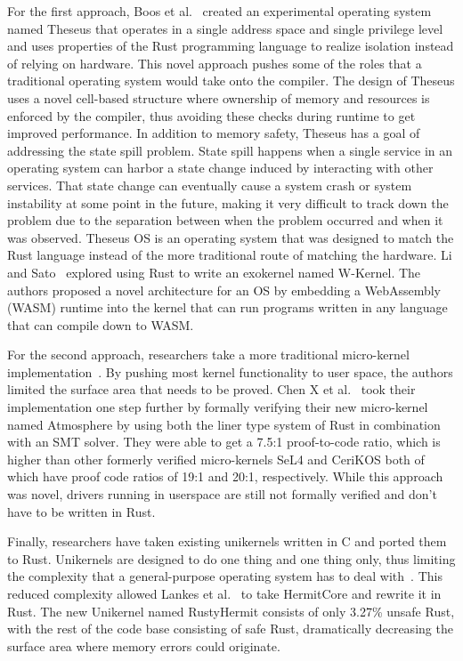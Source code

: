 \documentclass[sigconf]{acmart}
\begin{document}
For the first approach, Boos et al.~\cite{Boos2020-zh} created an experimental operating system
named Theseus that operates in a single address space and single privilege level and uses properties
of the Rust programming language to realize isolation instead of relying on hardware. This novel
approach pushes some of the roles that a traditional operating system would take onto the
compiler. The design of Theseus uses a novel cell-based structure where ownership of memory and
resources is enforced by the compiler, thus avoiding these checks during runtime to get improved
performance. In addition to memory safety, Theseus has a goal of addressing the state spill
problem. State spill happens when a single service in an operating system can harbor a state change
induced by interacting with other services. That state change can eventually cause a system crash or
system instability at some point in the future, making it very difficult to track down the problem
due to the separation between when the problem occurred and when it was observed. Theseus OS is an
operating system that was designed to match the Rust language instead of the more traditional route
of matching the hardware. Li and Sato~\cite{Li2024-yb} explored using Rust to write an exokernel named W-Kernel. The authors proposed a novel architecture for an OS by embedding a WebAssembly (WASM) runtime into the kernel that can run programs written in any language that can compile down to WASM.

For the second approach, researchers take a more traditional micro-kernel implementation~\cite{Chen2023-wb, Liang2021-bo}. By pushing most kernel functionality
to user space, the authors limited the surface area that needs to be proved. Chen X et al.~\cite{Chen2023-wb} took
their implementation one step further by formally verifying their new micro-kernel named Atmosphere
by using both the liner type system of Rust in combination with an SMT solver. They were
able to get a 7.5:1 proof-to-code ratio, which is higher than other formerly verified micro-kernels
SeL4 and CeriKOS both of which have proof code ratios of 19:1 and 20:1, respectively. While this
approach was novel, drivers running in userspace are still not formally verified and don't have to be
written in Rust.

Finally, researchers have taken existing unikernels written in C and ported them to Rust. Unikernels are designed to do one thing
and one thing only, thus limiting the complexity that a general-purpose operating system has to
deal with~\cite{Madhavapeddy2014-zw}. This reduced complexity allowed  Lankes et al.~\cite{Lankes2019-cm} to take HermitCore and rewrite it in Rust. The new
Unikernel named RustyHermit consists of only 3.27\% unsafe Rust, with the rest of the code base consisting of safe Rust, dramatically decreasing the surface area where memory errors could originate.
\end{document}
